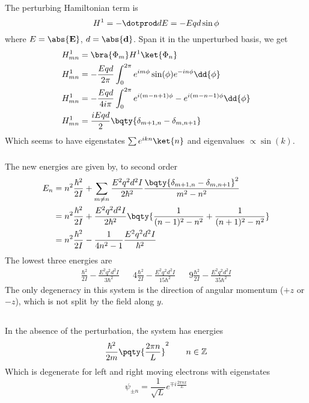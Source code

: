 \documentclass[12pt]{article}
\begin{document}
        \subsubsection{} The perturbing Hamiltonian term is \[
            H^1 = - \dotprod d E  = - Eq d \sin\phi
        \]
        where \(E = \abs{\bf E}\), \(d = \abs{\bf d}\). Span it in the unperturbed basis, we get \begin{align*}
            H^1_{mn} &= \bra{\Phi_m} H^1 \ket{\Phi_n} \\
            H^1_{mn} &= - \frac{Eqd}{2\pi} \int_0^{2\pi} e^{im\phi} \sin(\phi) e^{ - in\phi} \dd{\phi} \\
            H^1_{mn} &= - \frac{Eqd}{4i\pi} \int_0^{2\pi} e^{i(m - n + 1)\phi} - e^{i(m - n - 1)\phi} \dd{\phi} \\
            H^1_{mn} &= \frac{iEqd}{2}\bqty{\delta_{m + 1,n} - \delta_{m,n + 1} }
        \end{align*}
        Which seems to have eigenstates \(\sum e^{ikn} \ket{n} \) and eigenvalues \(\propto \sin(k)\).
        \subsubsection{} The new energies are given by, to second order\begin{align*}
            E_n &=  n^2\frac{\hbar^2}{2I} + \sum_{m\neq n} \frac{E^2q^2d^2I}{2\hbar^2}\frac{\bqty{\delta_{m + 1,n} - \delta_{m,n + 1} }^2}{m^2 - n^2}\\
            &= n^2\frac{\hbar^2}{2I} + \frac{E^2q^2d^2I}{2\hbar^2}\bqty{\frac{1}{(n - 1)^2 - n^2} +\frac{1}{(n + 1)^2 - n^2}}\\
            &= n^2\frac{\hbar^2}{2I} - \frac{1}{4n^2 - 1}\frac{E^2q^2d^2I}{\hbar^2} 
        \end{align*}
        The lowest three energies are \begin{align*}
            \frac{\hbar^2}{2I} - \frac{E^2q^2d^2I}{3\hbar^2}&&4\frac{\hbar^2}{2I} -  \frac{E^2q^2d^2I}{15\hbar^2}  && 9\frac{\hbar^2}{2I} - \frac{E^2q^2d^2I}{35\hbar^2} 
        \end{align*}
        The only degeneracy in this system is the direction of angular momentum (\( + z\) or \( - z\)), which is not split by the field along \(y\).
        \subsection{} In the absence of the perturbation, the system has energies \[
            \frac{\hbar^2}{2m}\pqty{\frac{2\pi n}{L}}^2\qquad n\in \mathbb{Z}
        \]
        Which is degenerate for left and right moving electrons with eigenstates \[
            \psi_{\pm n} = \frac{1}{\sqrt{L}} e^{\mp i \frac{2\pi nx}{L}}
        \]
        
\end{document}
